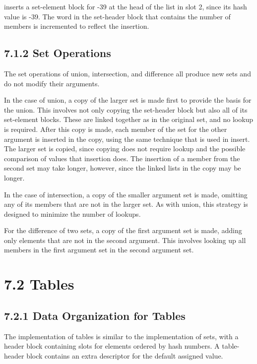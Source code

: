 
\noindent inserts a set-element block for -39 at the head of the list
in slot 2, since its hash value is -39. The word in the set-header
block that contains the number of members is incremented to reflect
the insertion.

\subsection[7.1.2 Set Operations]{7.1.2 Set Operations}

The set operations of union, intersection, and difference all produce
new sets and do not modify their arguments.


In the case of union, a copy of the larger set is made first to
provide the basis for the union. This involves not only copying the
set-header block but also all of its set-element blocks. These are
linked together as in the original set, and no lookup is
required. After this copy is made, each member of the set for the
other argument is inserted in the copy, using the same technique that
is used in insert. The larger set is copied, since copying does not
require lookup and the possible comparison of values that insertion
does. The insertion of a member from the second set may take longer,
however, since the linked lists in the copy may be longer.

In the case of intersection, a copy of the smaller argument set is
made, omitting any of its members that are not in the larger set. As
with union, this strategy is designed to minimize the number of
lookups.

For the difference of two sets, a copy of the first argument set is
made, adding only elements that are not in the second argument. This
involves looking up all members in the first argument set in the
second argument set.

\section[7.2 Tables]{7.2 Tables}
\subsection[7.2.1 Data Organization for Tables]{7.2.1 Data Organization for Tables}

The implementation of tables is similar to the implementation of sets,
with a header block containing slots for elements ordered by hash
numbers. A table-header block contains an extra descriptor for the
default assigned value.

